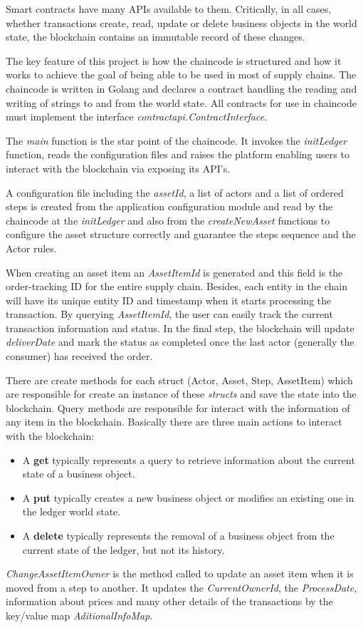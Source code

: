 Smart contracts have many APIs available to them. Critically, in all cases, whether transactions create, read, update or delete business objects in the world state, the blockchain contains an immutable record of these changes.

The key feature of this project is how the chaincode is structured and how it works to achieve the goal of being able to be used in most of supply chains. The chaincode is written in Golang and declares a contract handling the reading and writing of strings to and from the world state. All contracts for use in chaincode must implement the interface \textit{contractapi.ContractInterface}. 

The \textit{main} function is the star point of the chaincode. It invokes the \textit{initLedger} function, reads the configuration files and raises the platform enabling users to interact with the blockchain via exposing its API's.

A configuration file including the \textit{assetId}, a list of actors and a list of ordered steps is created from the application configuration module and read by the chaincode at the \textit{initLedger} and also from the \textit{createNewAsset} functions to configure the asset structure correctly and guarantee the steps sequence and the Actor rules.

When creating an asset item an \textit{AssetItemId} is generated and this field is the order-tracking ID for the entire supply chain. Besides, each entity in the chain will have its unique entity ID and timestamp when it starts processing the transaction. By querying \textit{AssetItemId}, the user can easily track the current transaction information and status. In the final step, the blockchain will update \textit{deliverDate} and mark the status as completed once the last actor (generally the consumer) has received the order.

There are create methods for each struct (Actor, Asset, Step, AssetItem) which are responsible for create an instance of these \textit{structs} and save the state into the blockchain. Query methods are responsible for interact with the information of any item in the blockchain. Basically there are three main actions to interact with the blockchain: 

\begin{itemize}
\item A \textbf{get} typically represents a query to retrieve information about the current state of a business object.
\item A \textbf{put} typically creates a new business object or modifies an existing one in the ledger world state.
\item A \textbf{delete} typically represents the removal of a business object from the current state of the ledger, but not its history.
\end{itemize}

\textit{ChangeAssetItemOwner} is the method called to update an asset item when it is moved from a step to another. It updates the \textit{CurrentOwnerId}, the \textit{ProcessDate}, information about prices and many other details of the transactions by the key/value map \textit{AditionalInfoMap}.
